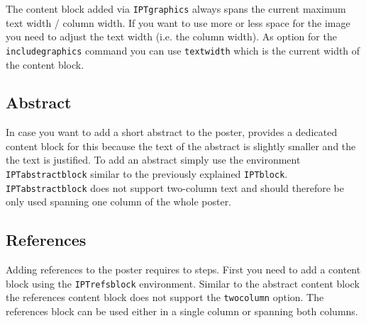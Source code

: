 The content block added via \texttt{IPTgraphics} always spans the current maximum text width / column width. If you want to use more or less space for the image you need to adjust the text width (i.e. the column width). As option for the \texttt{includegraphics} command you can use \texttt{\bs{}textwidth} which is the current width of the content block.








\subsection{Abstract}

In case you want to add a short abstract to the poster, \tugPoster provides a dedicated content block for this because the text of the abstract is slightly smaller and the the text is justified. To add an abstract simply use the environment \texttt{IPTabstractblock} similar to the previously explained \texttt{IPTblock}. \texttt{IPTabstractblock} does not support two-column text and should therefore be only used spanning one column of the whole poster.

\subsection{References}

Adding references to the poster requires to steps. First you need to add a content block using the \texttt{IPTrefsblock} environment. Similar to the abstract content block the references content block does not support the \texttt{twocolumn} option. The references block can be used either in a single column or spanning both columns.

